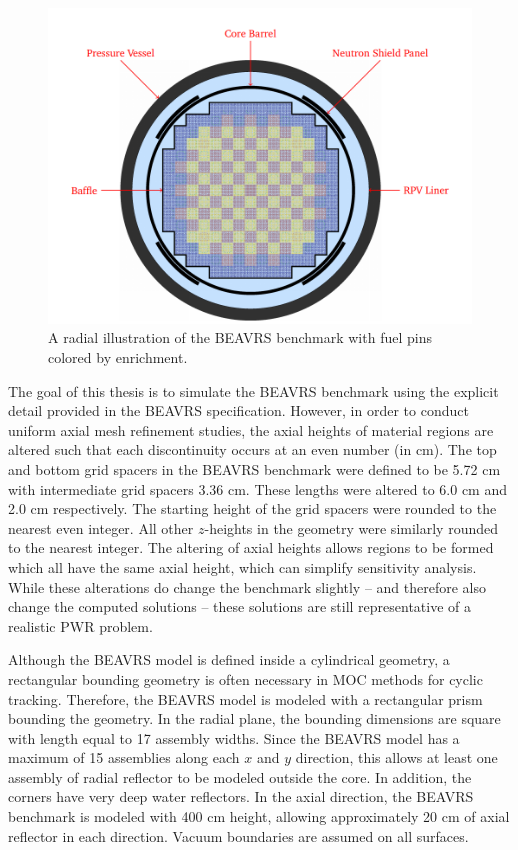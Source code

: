 \begin{figure}[h!]
	\centering
	\includegraphics[width=\linewidth]{figures/beavrs-visual/beavrs-assembly-enrichment.png}
	\caption{A radial illustration of the BEAVRS benchmark with fuel pins colored by enrichment.}
	\label{fig:beavrs-assembly-enrichment}
\end{figure} 

The goal of this thesis is to simulate the BEAVRS benchmark using the explicit detail provided in the BEAVRS specification. However, in order to conduct uniform axial mesh refinement studies, the axial heights of material regions are altered such that each discontinuity occurs at an even number (in cm). The top and bottom grid spacers in the BEAVRS benchmark were defined to be 5.72 cm with intermediate grid spacers 3.36 cm. These lengths were altered to 6.0 cm and 2.0 cm respectively. The starting height of the grid spacers were rounded to the nearest even integer. All other $z$-heights in the geometry were similarly rounded to the nearest integer. The altering of axial heights allows regions to be formed which all have the same axial height, which can simplify sensitivity analysis. While these alterations do change the benchmark slightly -- and therefore also change the computed solutions -- these solutions are still representative of a realistic \ac{PWR} problem.

Although the BEAVRS model is defined inside a cylindrical geometry, a rectangular bounding geometry is often necessary in \ac{MOC} methods for cyclic tracking. Therefore, the BEAVRS model is modeled with a rectangular prism bounding the geometry. In the radial plane, the bounding dimensions are square with length equal to 17 assembly widths. Since the BEAVRS model has a maximum of 15 assemblies along each $x$ and $y$ direction, this allows at least one assembly of radial reflector to be modeled outside the core. In addition, the corners have very deep water reflectors. In the axial direction, the BEAVRS benchmark is modeled with 400 cm height, allowing approximately 20 cm of axial reflector in each direction. Vacuum boundaries are assumed on all surfaces. 


